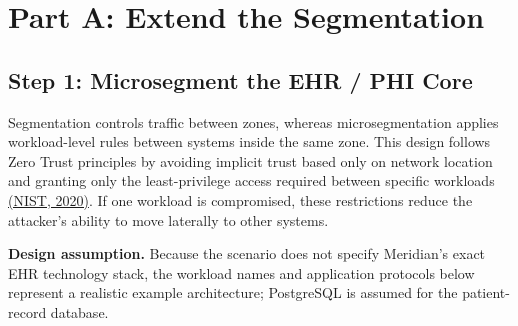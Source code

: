 \documentclass[11pt,letterpaper]{article}
\newcommand{\labpart}[1]{%
  \par\vspace{0.15em}%
  \Needspace{10\baselineskip}%
  \section*{#1}%
  \nopagebreak
}
\newcommand{\labstep}[1]{%
  \Needspace{8\baselineskip}%
  \subsection*{#1}%
  \nopagebreak
}
\newcommand{\aparef}[2]{\hyperref[ref:#1]{#2}}
\begin{document}
\vspace{0.25em}
\labpart{Part A: Extend the Segmentation}

\labstep{Step 1: Microsegment the EHR / PHI Core}

Segmentation controls traffic between zones, whereas microsegmentation applies workload-level rules between systems inside the same zone. This design follows Zero Trust principles by avoiding implicit trust based only on network location and granting only the least-privilege access required between specific workloads \aparef{nist}{(NIST, 2020)}. If one workload is compromised, these restrictions reduce the attacker's ability to move laterally to other systems.

\textbf{Design assumption.} Because the scenario does not specify Meridian's exact EHR technology stack, the workload names and application protocols below represent a realistic example architecture; PostgreSQL is assumed for the patient-record database.
\end{document}
